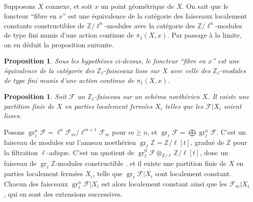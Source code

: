\documentclass{book}
\DeclareMathOperator{\gr}{gr}
\newcommand{\cF}{\mathcal{F}}
\newcommand{\dZ}{\mathbb{Z}}
\newtheorem{proposition_}[subsection]{Proposition}
\begin{document}
\subsection{}\label{II:2-3}

Supposons $X$ connexe, et soit $x$ un point géométrique de $X$. On sait que 
le foncteur ``fibre en $x$'' est une équivalence de la catégorie des 
faisceaux localement constants constructibles de $\dZ/\ell^n$-modules avec la 
catégorie des $\dZ/\ell^n$-modules de type fini munis d'une action continue 
de $\pi_1(X,x)$. Par passage à la limite, on en déduit la proposition 
suivante. 





\begin{proposition_}\label{II:2-4}
Sous les hypothèses ci-dessus, le foncteur ``fibre en $x$'' est une 
équivalence de la catégorie des $\dZ_\ell$-faisceaux lisse sur $X$ avec 
celle des $\dZ_\ell$-modules de type fini munis d'une action continue de 
$\pi_1(X,x)$. 
\end{proposition_}





\begin{proposition_}\label{II:2-5}
Soit $\cF$ un $\dZ_\ell$-faisceau sur un schéma noethérien $X$. Il existe 
une partition finie de $X$ en parties localement fermées $X_i$ telles que 
les $\cF|X_i$ soient lisses.
\end{proposition_}

Posons $\gr_\ell^n\cF=\ell^n\cF_m/\ell^{m+1}\cF_m$ pour $m\geqslant n$, et 
$\gr_\ell\cF=\bigoplus \gr_\ell^n\cF$. C'est un faisceau de modules sur 
l'anneau noethérien $\gr_\ell\dZ=\dZ/\ell[t]$, gradué de $\dZ$ pour la 
filtration $\ell$-adique. C'est un quotient de 
$\gr_\ell^0\cF \otimes_{\dZ/\ell} \dZ/\ell[t]$, donc un faisceau de 
$\gr_\ell\dZ$-modules constructible \cite[IX.2]{4}. et il existe une partition 
finie de $X$ en parties localement fermées $X_i$, telle que 
$\gr_\ell \cF|X_i$ sont localement constant. Chacun des faisceaux 
$\gr_\ell^n\cF|X_i$ est alors localement constant ainsi que les $\cF_m|X_i$, 
qui en sont des extensions successives. 





\subsection{}\label{II:2-6}
\end{document}
